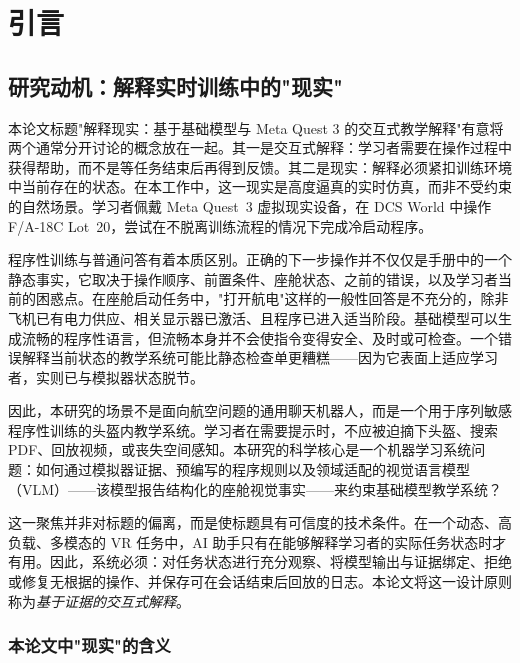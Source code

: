 %
\chapter{引言}\label{ch:introduction}

\section{研究动机：解释实时训练中的"现实"}\label{sec:intro-motivation}

本论文标题"解释现实：基于基础模型与 Meta Quest 3 的交互式教学解释"有意将两个通常分开讨论的概念放在一起。其一是交互式解释：学习者需要在操作过程中获得帮助，而不是等任务结束后再得到反馈。其二是现实：解释必须紧扣训练环境中当前存在的状态。在本工作中，这一现实是高度逼真的实时仿真，而非不受约束的自然场景。学习者佩戴 Meta Quest~3 虚拟现实设备，在 DCS World 中操作 F/A-18C Lot~20，尝试在不脱离训练流程的情况下完成冷启动程序。

程序性训练与普通问答有着本质区别。正确的下一步操作并不仅仅是手册中的一个静态事实，它取决于操作顺序、前置条件、座舱状态、之前的错误，以及学习者当前的困惑点。在座舱启动任务中，"打开航电"这样的一般性回答是不充分的，除非飞机已有电力供应、相关显示器已激活、且程序已进入适当阶段。基础模型可以生成流畅的程序性语言，但流畅本身并不会使指令变得安全、及时或可检查。一个错误解释当前状态的教学系统可能比静态检查单更糟糕——因为它表面上适应学习者，实则已与模拟器状态脱节。

因此，本研究的场景不是面向航空问题的通用聊天机器人，而是一个用于序列敏感程序性训练的头盔内教学系统。学习者在需要提示时，不应被迫摘下头盔、搜索 PDF、回放视频，或丧失空间感知。本研究的科学核心是一个机器学习系统问题：如何通过模拟器证据、预编写的程序规则以及领域适配的视觉语言模型（VLM）——该模型报告结构化的座舱视觉事实——来约束基础模型教学系统？

这一聚焦并非对标题的偏离，而是使标题具有可信度的技术条件。在一个动态、高负载、多模态的 VR 任务中，AI 助手只有在能够解释学习者的实际任务状态时才有用。因此，系统必须：对任务状态进行充分观察、将模型输出与证据绑定、拒绝或修复无根据的操作、并保存可在会话结束后回放的日志。本论文将这一设计原则称为\emph{基于证据的交互式解释}。

\subsection{本论文中"现实"的含义}

